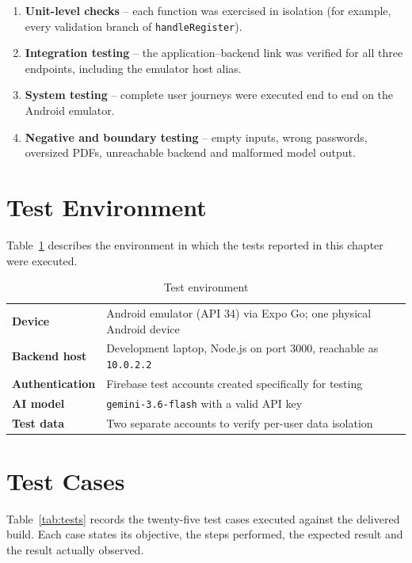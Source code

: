 \documentclass[12pt,a4paper,oneside]{report}
\begin{document}
\begin{enumerate}[leftmargin=*, itemsep=2pt]
  \item \textbf{Unit-level checks} -- each function was exercised in isolation
        (for example, every validation branch of \texttt{handleRegister}).
  \item \textbf{Integration testing} -- the application--backend link was verified
        for all three endpoints, including the emulator host alias.
  \item \textbf{System testing} -- complete user journeys were executed end to end on
        the Android emulator.
  \item \textbf{Negative and boundary testing} -- empty inputs, wrong passwords,
        oversized PDFs, unreachable backend and malformed model output.
\end{enumerate}

\section{Test Environment}

Table~\ref{tab:testenv} describes the environment in which the tests reported in this chapter were executed.

\begin{table}[H]
\centering
\caption{Test environment}
\label{tab:testenv}
\small
\begin{tabularx}{\textwidth}{@{}>{\bfseries}p{4.2cm}X@{}}
\toprule
Device          & Android emulator (API 34) via Expo Go; one physical Android device \\
Backend host    & Development laptop, Node.js on port 3000, reachable as \texttt{10.0.2.2} \\
Authentication  & Firebase test accounts created specifically for testing \\
AI model        & \texttt{gemini-3.6-flash} with a valid API key \\
Test data       & Two separate accounts to verify per-user data isolation \\
\bottomrule
\end{tabularx}
\end{table}

\section{Test Cases}

Table~\ref{tab:tests} records the twenty-five test cases executed against the delivered build. Each case states its objective, the steps performed, the expected result and the result actually observed.
\end{document}
